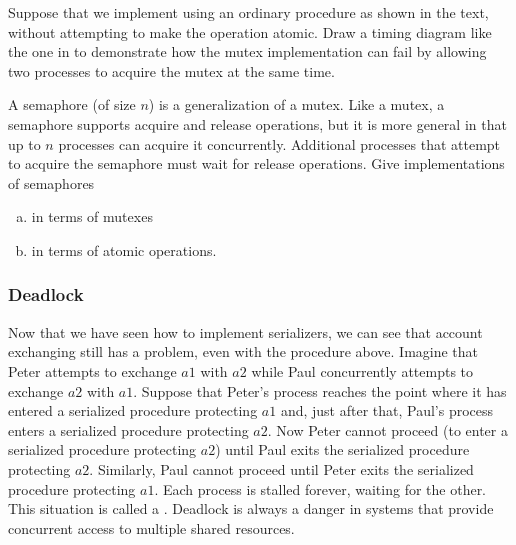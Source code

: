 \begin{exerciseGroup}
\label{Exercise 3.46}
 Suppose that we implement
  using an ordinary procedure as shown in the text, without
attempting to make the operation atomic.  Draw a timing diagram like the one in
 to demonstrate how the mutex implementation can fail by
allowing two processes to acquire the mutex at the same time.

\label{Exercise 3.47}
 A semaphore (of size \( n \)) is a
generalization of a mutex.  Like a mutex, a semaphore supports acquire and
release operations, but it is more general in that up to \( n \) processes can
acquire it concurrently.  Additional processes that attempt to acquire the
semaphore must wait for release operations.  Give implementations of semaphores

\begin{enumerate}[a.]

\item
in terms of mutexes

\item
in terms of atomic  operations.

\end{enumerate}
\end{exerciseGroup}

\subsubsection*{Deadlock}

Now that we have seen how to implement serializers, we can see that account
exchanging still has a problem, even with the 
procedure above.  Imagine that Peter attempts to exchange \( a1 \) with \( a2 \)
while Paul concurrently attempts to exchange \( a2 \) with \( a1 \).  Suppose that
Peter's process reaches the point where it has entered a serialized procedure
protecting \( a1 \) and, just after that, Paul's process enters a serialized
procedure protecting \( a2 \).  Now Peter cannot proceed (to enter a serialized
procedure protecting \( a2 \)) until Paul exits the serialized procedure
protecting \( a2 \).  Similarly, Paul cannot proceed until Peter exits the
serialized procedure protecting \( a1 \).  Each process is stalled forever,
waiting for the other.  This situation is called a .
Deadlock is always a danger in systems that provide concurrent access to
multiple shared resources.

